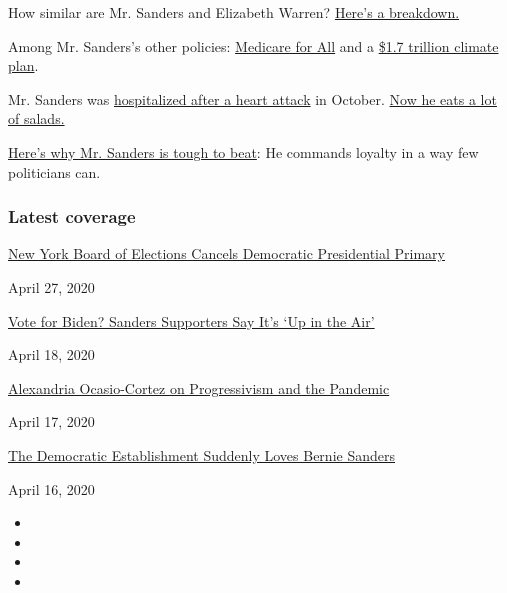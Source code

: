 How similar are Mr. Sanders and Elizabeth Warren?
\href{https://www.nytimes3xbfgragh.onion/2019/07/30/us/politics/elizabeth-warren-bernie-sanders.html}{Here's
a breakdown.}

Among Mr. Sanders's other policies:
\href{https://www.nytimes3xbfgragh.onion/2019/03/23/health/private-health-insurance-medicare-for-all-bernie-sanders.html}{Medicare
for All} and a
\href{https://www.nytimes3xbfgragh.onion/2019/08/22/climate/bernie-sanders-climate-change.html}{\$1.7
trillion climate plan}.

Mr. Sanders was
\href{https://www.nytimes3xbfgragh.onion/2019/10/04/us/politics/bernie-sanders-hospital.html}{hospitalized
after a heart attack} in October.
\href{https://www.nytimes3xbfgragh.onion/2019/11/13/us/politics/bernie-sanders-heart-attack.html}{Now
he eats a lot of salads.}

\href{https://www.nytimes3xbfgragh.onion/2019/12/26/us/politics/bernie-sanders-iowa-democrats.html}{Here's
why Mr. Sanders is tough to beat}: He commands loyalty in a way few
politicians can.

\hypertarget{latest-coverage}{%
\subsubsection{Latest coverage}\label{latest-coverage}}

\href{https://www.nytimes3xbfgragh.onion/2020/04/27/us/politics/democratic-primary-canceled-coronavirus.html}{New
York Board of Elections Cancels Democratic Presidential Primary}

April 27, 2020

\href{https://www.nytimes3xbfgragh.onion/2020/04/18/us/politics/bernie-sanders-voters-biden.html}{Vote
for Biden? Sanders Supporters Say It's `Up in the Air'}

April 18, 2020

\href{https://www.nytimes3xbfgragh.onion/2020/04/17/podcasts/the-daily/alexandria-ocasio-cortez-coronavirus.html}{Alexandria
Ocasio-Cortez on Progressivism and the Pandemic}

April 17, 2020

\href{https://www.nytimes3xbfgragh.onion/2020/04/16/us/politics/bernie-sanders-joe-biden-democrats.html}{The
Democratic Establishment Suddenly Loves Bernie Sanders}

April 16, 2020

\begin{itemize}
\item
\item
\item
\item
\end{itemize}

